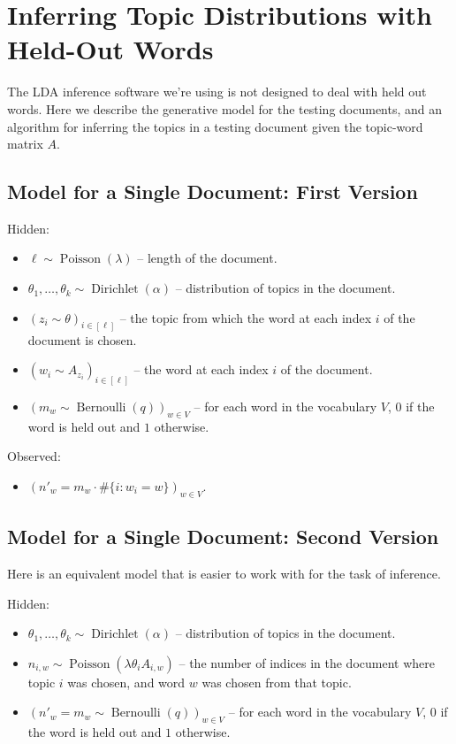 \documentclass{article}
\DeclareMathOperator\Bernoulli{Bernoulli}
\DeclareMathOperator\Dirichlet{Dirichlet}
\DeclareMathOperator\Poisson{Poisson}
\begin{document}
\section{Inferring Topic Distributions with Held-Out Words}

The LDA inference software we're using is not designed to deal with held out
    words.
Here we describe the generative model for the testing documents, and an
    algorithm for inferring the topics in a testing document given the
    topic-word matrix $A$.

\subsection{Model for a Single Document: First Version}

Hidden:
\begin{itemize}
\item $\ell \sim \Poisson(\lambda)$ -- length of the document.
\item $\theta_1, \dotsc, \theta_k \sim \Dirichlet(\alpha)$ -- distribution of topics in the document.
\item $(z_i \sim \theta)_{i \in [\ell]}$ -- the topic from which the word at each index $i$ of the document is chosen.
\item $(w_i \sim A_{z_i})_{i \in [\ell]}$ -- the word at each index $i$ of the document.
\item $(m_w \sim \Bernoulli(q))_{w \in V}$ -- for each word in the vocabulary $V$, $0$ if the word is held out and $1$ otherwise.
\end{itemize}

Observed:
\begin{itemize}
\item $(n'_w = m_w \cdot \# \{i : w_i = w\})_{w \in V}$.
\end{itemize}

\subsection{Model for a Single Document: Second Version}

Here is an equivalent model that is easier to work with for the task of inference.

Hidden:
\begin{itemize}
\item $\theta_1, \dotsc, \theta_k \sim \Dirichlet(\alpha)$ -- distribution of topics in the document.
\item $n_{i, w} \sim \Poisson(\lambda \theta_i A_{i, w})$ -- the number of indices in the document where topic $i$ was chosen, and word $w$ was chosen from that topic.
\item $(n'_w = m_w \sim \Bernoulli(q))_{w \in V}$ -- for each word in the vocabulary $V$, $0$ if the word is held out and $1$ otherwise.
\end{itemize}
\end{document}
